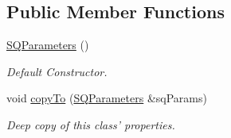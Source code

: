 \subsection*{Public Member Functions}
\begin{DoxyCompactItemize}
\item 
\hypertarget{classope_1_1_s_q_parameters_a067ef9962c927a0ddeb61d3b375833bb}{\hyperlink{classope_1_1_s_q_parameters_a067ef9962c927a0ddeb61d3b375833bb}{S\-Q\-Parameters} ()}\label{classope_1_1_s_q_parameters_a067ef9962c927a0ddeb61d3b375833bb}

\begin{DoxyCompactList}\small\item\em Default Constructor. \end{DoxyCompactList}\item 
\hypertarget{classope_1_1_s_q_parameters_a1b76f1c8c159d186a9b7d4a8397d1cc0}{void \hyperlink{classope_1_1_s_q_parameters_a1b76f1c8c159d186a9b7d4a8397d1cc0}{copy\-To} (\hyperlink{classope_1_1_s_q_parameters}{S\-Q\-Parameters} \&sq\-Params)}\label{classope_1_1_s_q_parameters_a1b76f1c8c159d186a9b7d4a8397d1cc0}

\begin{DoxyCompactList}\small\item\em Deep copy of this class' properties. \end{DoxyCompactList}\end{DoxyCompactItemize}
